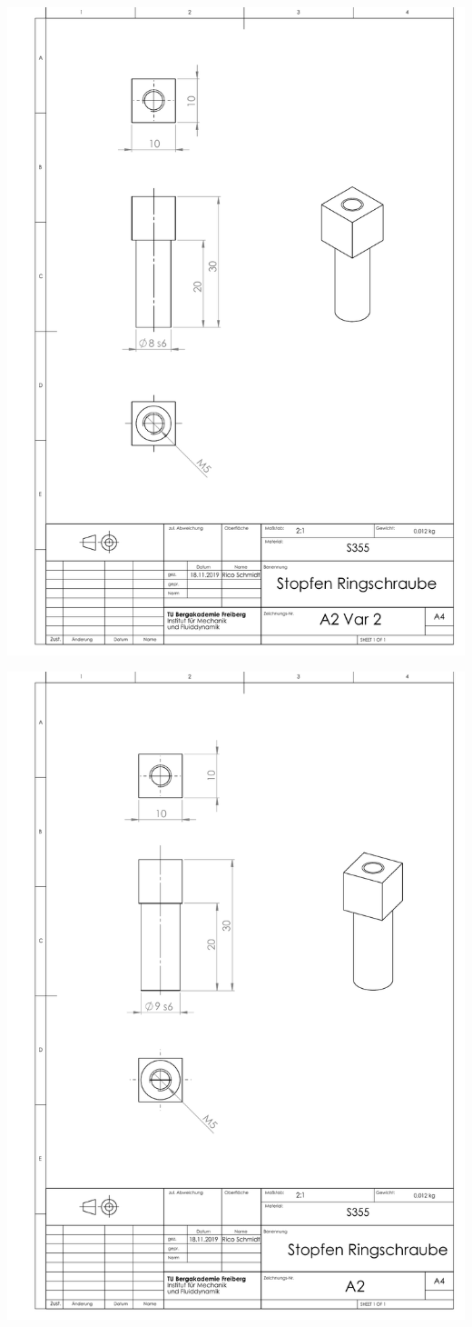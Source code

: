 	\includegraphics[angle=90,width=1.0\textwidth]{Anhang/PDFs/Stopfen_Schaft_Ringschraube_Var2}
	
	\includegraphics[angle=-90,width=1.0\textwidth]{Anhang/PDFs/Stopfen_Schaft_Ringschraube}
	
	